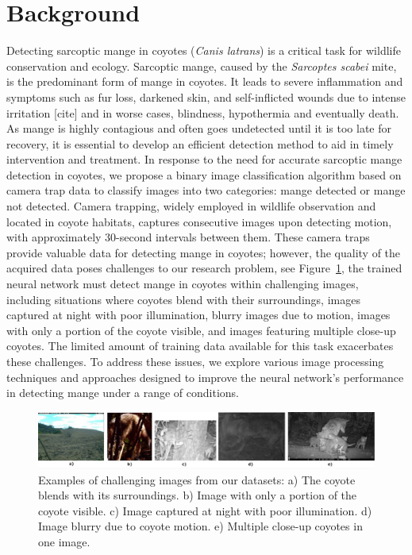 \documentclass{article}
\begin{document}
\section{Background}
Detecting sarcoptic mange in coyotes (\textit{Canis latrans}) is a critical task for
wildlife conservation and ecology. Sarcoptic mange, caused by the \textit{Sarcoptes
scabei} mite, is the predominant form of mange in coyotes. It leads to severe
inflammation and symptoms such as fur loss, darkened skin, and self-inflicted
wounds due to intense irritation [cite] and in worse cases, blindness,
hypothermia and eventually death. As mange is highly contagious and often goes
undetected until it is too late for recovery, it is essential to develop an
efficient detection method to aid in timely intervention and treatment. In
response to the need for accurate sarcoptic mange detection in coyotes, we
propose a binary image classification algorithm based on camera trap data to
classify images into two categories: mange detected or mange not detected.
Camera trapping, widely employed in wildlife observation and located in coyote
habitats, captures consecutive images upon detecting motion, with approximately
30-second intervals between them. These camera traps provide valuable data for
detecting mange in coyotes; however, the quality of the acquired data poses
challenges to our research problem, see Figure~\ref{fig:fig1}, the trained neural
network must detect mange in coyotes within challenging images, including
situations where coyotes blend with their surroundings, images captured at night
with poor illumination, blurry images due to motion, images with only a portion
of the coyote visible, and images featuring multiple close-up coyotes. The
limited amount of training data available for this task exacerbates these
challenges. To address these issues, we explore various image processing
techniques and approaches designed to improve the neural network's performance
in detecting mange under a range of conditions.

\begin{figure}
\centering
\includegraphics[width=1.0\textwidth]{fig1.jpeg}
\caption{\label{fig:fig1}Examples of challenging images from our datasets: a)
The coyote blends with its surroundings. b) Image with only a portion of the
coyote visible. c) Image captured at night with poor illumination. d) Image
blurry due to coyote motion. e) Multiple close-up coyotes in one image.}
\end{figure}
\end{document}
